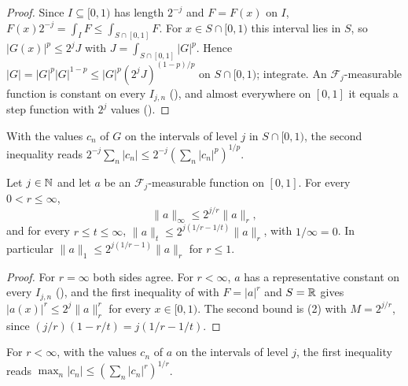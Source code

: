 \begin{proof}
\leanok
Since $I \subseteq [0, 1)$ has length $2^{-j}$ and $F = F(x)$ on $I$,
$F(x) 2^{-j} = \int_I F \leq \int_{S \cap [0, 1]} F$. For $x \in S \cap [0, 1)$ this interval
lies in $S$, so $|G(x)|^p \leq 2^j J$ with $J = \int_{S \cap [0, 1]} |G|^p$. Hence
$|G| = |G|^p |G|^{1-p} \leq |G|^p (2^j J)^{(1-p)/p}$ on $S \cap [0, 1)$; integrate. An
$\mathcal{F}_j$-measurable function is constant on every $I_{j,n}$
(), and almost everywhere on $[0, 1]$ it equals a step function with
$2^j$ values ().
\end{proof}

With the values $c_n$ of $G$ on the intervals of level $j$ in $S \cap [0, 1)$, the second
inequality reads $2^{-j} \sum_n |c_n| \leq 2^{-j} (\sum_n |c_n|^p)^{1/p}$.

\begin{lemma}
\label{lem:steps-sup-bound}
\leanok
{}
Let $j \in \mathbb{N}$ and let $a$ be an $\mathcal{F}_j$-measurable function on $[0, 1]$. For every
$0 < r \leq \infty$,
\[
  \|a\|_\infty \leq 2^{j/r} \|a\|_r ,
\]
and for every $r \leq t \leq \infty$, $\|a\|_t \leq 2^{j(1/r - 1/t)} \|a\|_r$, with
$1/\infty = 0$. In particular $\|a\|_1 \leq 2^{j(1/r - 1)} \|a\|_r$ for $r \leq 1$.
\end{lemma}

\begin{proof}
\leanok
{}
For $r = \infty$ both sides agree. For $r < \infty$, $a$ has a representative constant on every
$I_{j,n}$ (), and the first inequality of 
with $F = |a|^r$ and $S = \mathbb{R}$ gives $|a(x)|^r \leq 2^j \|a\|_r^r$ for every $x \in [0, 1)$. The
second bound is (2) with $M = 2^{j/r}$, since
$(j/r)(1 - r/t) = j(1/r - 1/t)$.
\end{proof}

For $r < \infty$, with the values $c_n$ of $a$ on the intervals of level $j$, the first inequality
reads $\max_n |c_n| \leq (\sum_n |c_n|^r)^{1/r}$.

